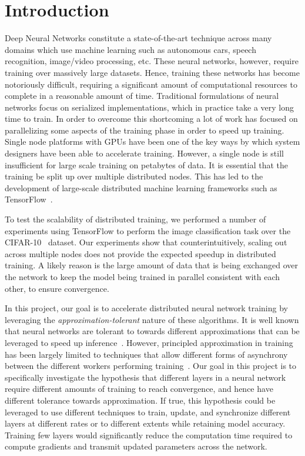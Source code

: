 \section{Introduction}

Deep Neural Networks constitute a state-of-the-art technique across many domains which use machine learning such as autonomous cars, speech recognition, image/video processing, etc. These neural networks, however, require training over massively large datasets. Hence, training these networks has become notoriously difficult, requiring a significant amount of computational resources to complete in a reasonable amount of time. Traditional formulations of neural networks focus on serialized implementations, which in practice take a very long time to train. In order to overcome this shortcoming a lot of work has focused on parallelizing some aspects of the training phase in order to speed up training. Single node platforms with GPUs have been one of the key ways by which system designers have been able to accelerate training. However, a single node is still insufficient for large scale training on petabytes of data. It is essential that the training be split up over multiple distributed nodes. This has led to the development of large-scale distributed machine learning frameworks such as TensorFlow~\cite{tensorflow}. 

To test the scalability of distributed training, we performed a number of experiments using TensorFlow to perform the image classification task over the CIFAR-10~\cite{cifar10} dataset. Our experiments show that counterintuitively, scaling out across multiple nodes does not provide the expected speedup in distributed training. A likely reason is the large amount of data that is being exchanged over the network to keep the model being trained in parallel consistent with each other, to ensure convergence. 

In this project, our goal is to accelerate distributed neural network training by leveraging the \emph{approximation-tolerant} nature of these algorithms. It is well known that neural networks are tolerant to towards different approximations that can be leveraged to speed up inference~\cite{compresseddnn}\cite{eie}. However, principled approximation in training has been largely limited to techniques that allow different forms of asynchrony between the different workers performing training~\cite{ganger,garth,communicationthesis}. Our goal in this project is to specifically investigate the hypothesis that different layers in a neural network require different amounts of training to reach convergence, and hence have different tolerance towards approximation. If true, this hypothesis could be leveraged to use different techniques to train, update, and synchronize different layers at different rates or to different extents while retaining model accuracy. Training few layers would significantly reduce the computation time required to compute gradients and transmit updated parameters across the network.  

